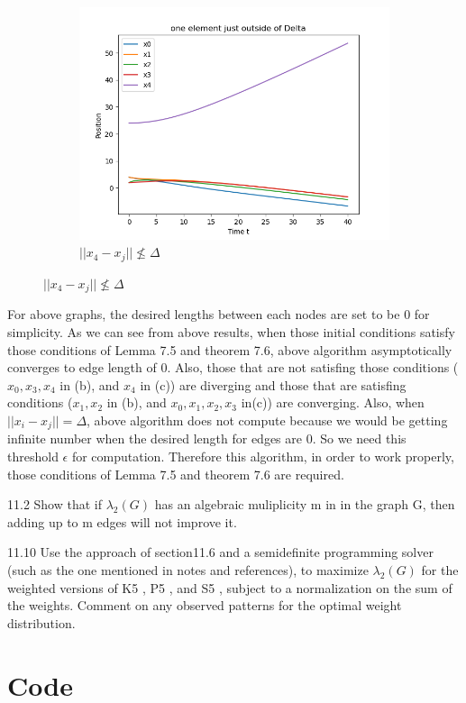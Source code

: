 \documentclass{article}
\begin{document}
\begin{problem}
\begin{figure}[!h]
        \begin{subfigure}{0.3\textwidth}
            \includegraphics[width=\textwidth]{./img/p3_3.png}
            \caption{$||x_4 - x_j|| \nleq \Delta$ }
        \end{subfigure}
    \end{figure}

    For above graphs, the desired lengths between each nodes are set to be 0 for simplicity. As we can see from above results, when those initial conditions satisfy those conditions of Lemma 7.5 and theorem 7.6, above algorithm asymptotically converges to edge length of 0. Also, those that are not satisfing those conditions ($x_0, x_3, x_4$ in (b), and $x_4$ in (c)) are diverging and those that are satisfing conditions ($x_1, x_2$ in (b), and $x_0, x_1, x_2, x_3$ in(c)) are converging. Also, when $||x_i - x_j|| = \Delta$, above algorithm does not compute because we would be getting infinite number when the desired length for edges are 0. So we need this threshold $\epsilon$ for computation. Therefore this algorithm, in order to work properly, those conditions of Lemma 7.5 and theorem 7.6 are required. 
\end{problem}

\begin{problem}
    11.2 Show that if $\lambda_2(G)$ has an algebraic muliplicity m in in the graph G, then adding up to m edges will not improve it. 

\end{problem}
\begin{problem}
    11.10 Use the approach of section11.6 and a semideﬁnite programming
    solver (such as the one mentioned in notes and references), to maximize
    $\lambda_2 (G)$ for the weighted versions of K5 , P5 , and S5 , subject to a normalization on the sum of the weights. Comment on any observed patterns for the
    optimal weight distribution.
\end{problem}
\newpage
\section*{Code}
\begin{verbatim}
\end{verbatim}
\end{document}
